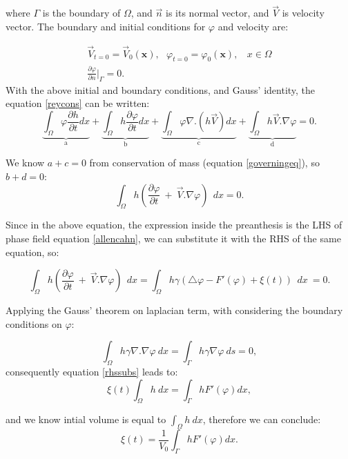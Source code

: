 \documentclass[letterpaper,10pt]{article}
\begin{document}
where $ \Gamma $ is the boundary of $\Omega$, and $\overrightarrow{n}$ is its normal vector, and $\overrightarrow{V}$ is velocity vector. The boundary and initial conditions for $\varphi$ and velocity are:

\begin{gather*} 
\overrightarrow{V}_{t=0}=\overrightarrow{V}_0(\textbf{x}), \ \ \ 
\varphi_{t=0}=\varphi_0(\textbf{x}), \ \ \ \ x\in \Omega \\
\frac{\partial \varphi}{\partial n}\vert_{\Gamma} = 0.
\end{gather*}
With the above initial and boundary conditions, and Gauss' identity, the equation \eqref{reycons} can be written:
\begin{equation}
\label{expand}
\underbrace{\int_\Omega \varphi \frac{\partial h}{\partial t} dx}_\text{a} + 
\underbrace{\int_\Omega h \frac{\partial \varphi}{\partial t} dx}_\text{b} +
\underbrace{\int_\Omega \varphi \nabla.(h\overrightarrow{V}) dx}_\text{c} +
\underbrace{\int_\Omega h\overrightarrow{V}.\nabla \varphi }_\text{d}
= 0.
\end{equation}

We know $a+c=0$ from conservation of mass (equation \eqref{governingeq}), so   $b+d=0$:
\begin{equation}
\label{expand1}
 \int_\Omega h (\frac{\partial \varphi}{\partial t} \  + \
\overrightarrow{V}.\nabla \varphi) \ \ dx = 0.
\end{equation}

Since in the above equation, the expression inside the preanthesis is the LHS of phase field equation \eqref{allencahn}, we can substitute it with the RHS of the same equation, so:

\begin{equation}
\label{rhssubs}
 \int_\Omega h (\frac{\partial \varphi}{\partial t} \  + \
\overrightarrow{V}.\nabla \varphi) \ \ dx = 
\int_\Omega h \gamma (\bigtriangleup \varphi -F'(\varphi)+\xi(t))  \ \ dx \ = 0 .
\end{equation}

Applying the Gauss' theorem on laplacian term, with considering the boundary conditions on $\varphi$:

\begin{equation}
\label{lapbound}
 \int_\Omega h \gamma  \nabla. \nabla \varphi \ dx = 
 \int_\Gamma h \gamma \nabla \varphi \ ds = 0,
\end{equation}
consequently equation \eqref{rhssubs} leads to:
\begin{equation}
\label{xitcon}
\xi(t)  \int_\Omega h  \ dx = 
 \int_\Gamma h F'(\varphi) dx, 
 \end{equation}


and we know intial volume is equal to $\int_\Omega h  \ dx $, therefore we can conclude:
\begin{equation}
\label{finalxi}
\xi(t)  = \frac{1}{V_0} \int_\Gamma h F'(\varphi) dx. 
 \end{equation}

 


\end{document}
